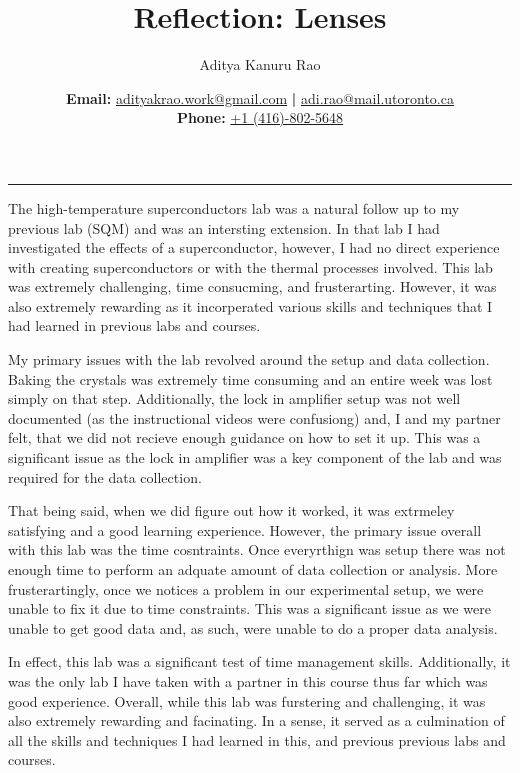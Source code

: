 \documentclass[11pt,a4paper]{article}
\newcommand\psetnum{Reflection: Lenses}
\newcommand\yourname{Aditya Kanuru Rao}
\begin{document}
	\title{\vspace{-4cm}\psetnum}
        \author{\yourname}
	\date{\vspace{-0.3em}\textbf{Email:} \href{mailto:adityakrao.work@gmail.com}{adityakrao.work@gmail.com} \textbf{|} \href{mailto:adi.rao@mail.utoronto.ca}{adi.rao@mail.utoronto.ca}\\\textbf{Phone:} \href{tel:14168025648}{+1 (416)-802-5648}}
        \vspace{0cm}
	\maketitle
\vspace{-1.2cm}
\rule{\linewidth}{0.5pt}

\textbf{}

The high-temperature superconductors lab was a natural follow up to my previous lab (SQM) and was an intersting extension. In that lab I had investigated the effects of a superconductor, however, I had no direct experience with creating superconductors or with the thermal processes involved. This lab was extremely  challenging, time consucming, and frusterarting. However, it was also extremely rewarding as it incorperated various skills and techniques that I had learned in previous labs and courses.

My primary issues with the lab revolved around the setup and data collection. Baking the crystals was extremely time consuming and an entire week was lost simply on that step. Additionally, the lock in amplifier setup was not well documented (as the instructional videos were confusiong) and, I and my partner felt, that we did not recieve enough guidance on how to set it up. This was a significant issue as the lock in amplifier was a key component of the lab and was required for the data collection.

That being said, when we did figure out how it worked, it was extrmeley satisfying and a good learning experience. However, the primary issue overall with this lab was the time cosntraints. Once everyrthign was setup there was not enough time to perform an adquate amount of data collection or analysis. More frusterartingly, once we notices a problem in our experimental setup, we were unable to fix it due to time constraints. This was a significant issue as we were unable to get good data and, as such, were unable to do a proper data analysis.

In effect, this lab was a significant test of time management skills. Additionally, it was the only lab I have taken with a partner in this course thus far which was good experience. Overall, while this lab was furstering and challenging, it was also extremely rewarding and facinating. In a sense, it served as a culmination of all the skills and techniques I had learned in this, and previous previous labs and courses.
\end{document}
